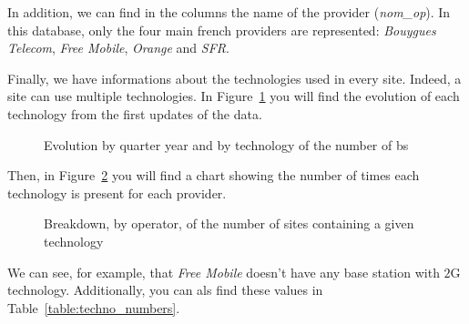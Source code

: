 \documentclass[lettersize,journal,english]{IEEEtran}
\begin{document}
        In addition, we can find in the columns the name of the provider (\textsl{nom\_op}). In this database, only the four main french providers are represented:
        \emph{Bouygues Telecom}, \emph{Free Mobile}, \emph{Orange} and \emph{SFR}.

        Finally, we have informations about the technologies used in every site. Indeed, a site can use multiple technologies.
        In Figure~\ref{fig:data_evolution} you will find the evolution of each technology from the first updates of the data.
        \begin{figure}
            \centering
            \caption{Evolution by quarter year and by technology of the number of \acrshort{bs}}
            \label{fig:data_evolution}
        \end{figure}
        Then, in Figure~\ref{fig:data_technos} you will find a chart showing the number of times each technology is present for each provider.
        \begin{figure}
            \centering
            \caption{Breakdown, by operator, of the number of sites containing a given technology}
            \label{fig:data_technos}
        \end{figure}
        We can see, for example, that \emph{Free Mobile} doesn't have any base station with $2$G technology. Additionally, you can als find these values in Table~\ref{table:techno_numbers}.
\end{document}
